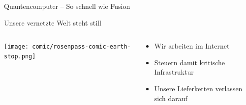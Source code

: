 \begin{frame}[T]{Quantencomputer – So schnell wie Fusion}
  
%

\end{frame}


\begin{frame}[T]{Unsere vernetzte Welt steht still}
  \begin{columns}[T,fullwidth]
    \begin{column}{.55\linewidth}
      \texttt{[image: comic/rosenpass-comic-earth-stop.png]}
    \end{column}
    \begin{column}{.45\linewidth}
      \vspace{10em}
      \begin{itemize}
        \setlength{\itemindent}{-1.2ex}
        \item Wir arbeiten im Internet
        \setlength{\itemindent}{-2ex}
        \item Steuern damit kritische Infrastruktur
        \setlength{\itemindent}{-3.8ex}
        \item Unsere Lieferketten verlassen sich darauf
      \end{itemize}
    \end{column}
    \hfill
  \end{columns}
\end{frame}


